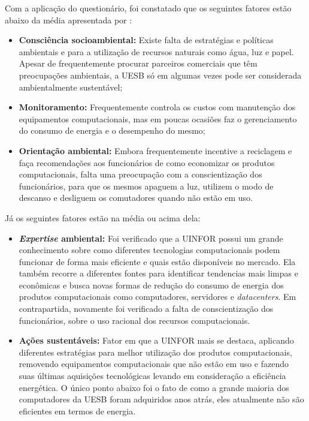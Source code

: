 Com a aplicação do questionário, foi constatado que os seguintes fatores estão abaixo da média apresentada por : 
\begin{itemize}
    \item \textbf{Consciência socioambiental:} Existe falta de estratégias e políticas ambientais e para a utilização de recursos naturais como água, luz e papel. Apesar de frequentemente procurar parceiros comerciais que têm preocupações ambientais, a UESB só em algumas vezes pode ser considerada ambientalmente sustentável; 
    \item \textbf{Monitoramento:} Frequentemente controla os custos com manutenção dos equipamentos computacionais, mas em poucas ocasiões faz o gerenciamento do consumo de energia e o desempenho do mesmo;
    \item \textbf{Orientação ambiental:} Embora frequentemente incentive a reciclagem e faça recomendações aos funcionários de como economizar os produtos computacionais, falta uma preocupação com a conscientização dos funcionários, para que os mesmos apaguem a luz, utilizem o modo de descanso e desliguem os comutadores quando não estão em uso.
\end{itemize}

Já os seguintes fatores estão na média ou acima dela:

\begin{itemize}
    \item \textbf{\textit{Expertise} ambiental:} Foi verificado que a UINFOR possui um grande conhecimento sobre como diferentes tecnologias computacionais podem funcionar de forma mais eficiente e quais estão disponíveis no mercado. Ela também recorre a diferentes fontes para identificar tendencias mais limpas e econômicas e busca novas formas de redução do consumo de energia dos produtos computacionais como computadores, servidores e \textit{datacenters}. Em contrapartida, novamente foi verificado a falta de conscientização dos funcionários, sobre o uso racional dos recursos computacionais. 
    \item \textbf{Ações sustentáveis:} Fator em que a UINFOR mais se destaca, aplicando diferentes estratégias para melhor utilização dos produtos computacionais, removendo equipamentos computacionais que não estão em uso e fazendo suas últimas aquisições tecnológicas levando em consideração a eficiência energética. O único ponto abaixo foi o fato de como a grande maioria dos computadores da UESB foram adquiridos anos atrás, eles atualmente não são eficientes em termos de energia.
\end{itemize}


